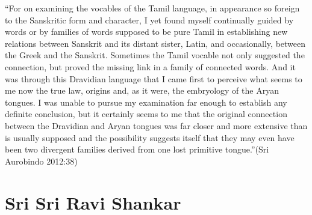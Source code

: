 \begin{myquote}
“For on examining the vocables of the Tamil language, in appearance so foreign to the Sanskritic form and character, I yet found myself continually guided by words or by families of words supposed to be pure Tamil in establishing new relations between Sanskrit and its distant sister, Latin, and occasionally, between the Greek and the Sanskrit. Sometimes the Tamil vocable not only suggested the connection, but proved the missing link in a family of connected words. And it was through this Dravidian language that I came first to perceive what seems to me now the true law, origins and, as it were, the embryology of the Aryan tongues. I was unable to pursue my examination far enough to establish any definite conclusion, but it certainly seems to me that the original connection between the Dravidian and Aryan tongues was far closer and more extensive than is usually supposed and the possibility suggests itself that they may even have been two divergent families derived from one lost primitive tongue.”(Sri Aurobindo 2012:38)
\end{myquote}


\section*{Sri Sri Ravi Shankar}

